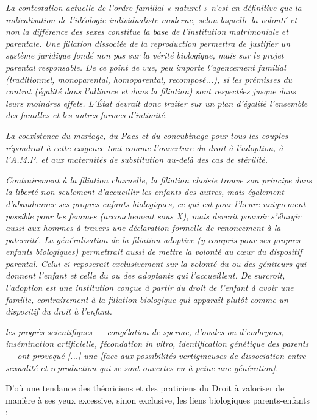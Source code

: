 \begin{displayquote}
\emph{La contestation actuelle de l'ordre familial « naturel » n'est en définitive que la radicalisation de l'idéologie individualiste moderne, selon laquelle la volonté et non la différence des sexes constitue la base de l'institution matrimoniale et parentale. Une filiation dissociée de la reproduction permettra de justifier un système juridique fondé non pas sur la vérité biologique, mais sur le projet parental responsable. De ce point de vue, peu importe l'agencement familial (traditionnel, monoparental, homoparental, recomposé...), si les prémisses du contrat (égalité dans l'alliance et dans la filiation) sont respectées jusque dans leurs moindres effets. L'État devrait donc traiter sur un plan d'égalité l'ensemble des familles et les autres formes d'intimité.}
 
\emph{La coexistence du mariage, du Pacs et du concubinage pour tous les couples répondrait à cette exigence tout comme l'ouverture du droit à l'adoption, à l'A.M.P. et aux maternités de substitution au-delà des cas de stérilité.}
 
\emph{Contrairement à la filiation charnelle, la filiation choisie trouve son principe dans la liberté non seulement d'accueillir les enfants des autres, mais également d'abandonner ses propres enfants biologiques, ce qui est pour l'heure uniquement possible pour les femmes (accouchement sous X), mais devrait pouvoir s'élargir aussi aux hommes à travers une déclaration formelle de renoncement à la paternité. La généralisation de la filiation adoptive (y compris pour ses propres enfants biologiques) permettrait aussi de mettre la volonté au cœur du dispositif parental. Celui-ci reposerait exclusivement sur la volonté du ou des géniteurs qui donnent l'enfant et celle du ou des adoptants qui l'accueillent. De surcroît, l'adoption est une institution conçue à partir du droit de l'enfant à avoir une famille, contrairement à la filiation biologique qui apparaît plutôt comme un dispositif du droit à l'enfant.}
 
\emph{les progrès scientifiques --- congélation de sperme, d'ovules ou d'embryons, insémination artificielle, fécondation in vitro, identification génétique des parents --- ont provoqué \emph{[...]} une  \emph{[face aux possibilités vertigineuses de dissociation entre sexualité et reproduction qui se sont ouvertes en à peine une génération]}.}
 
\end{displayquote}

 D'où une tendance des théoriciens et des praticiens du Droit à valoriser de manière à ses yeux excessive, sinon exclusive, les liens biologiques parents-enfants :
 
